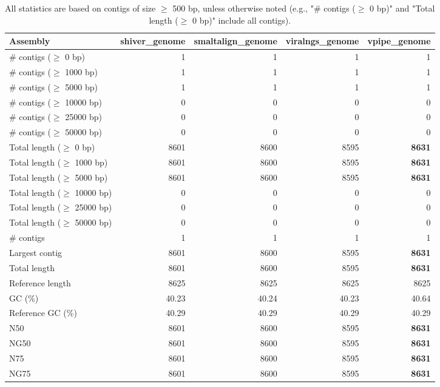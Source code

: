 \documentclass[12pt,a4paper]{article}
\begin{document}
\begin{table}[ht]
\begin{center}
\caption{All statistics are based on contigs of size $\geq$ 500 bp, unless otherwise noted (e.g., "\# contigs ($\geq$ 0 bp)" and "Total length ($\geq$ 0 bp)" include all contigs).}
\begin{tabular}{|l*{4}{|r}|}
\hline
Assembly & shiver\_genome & smaltalign\_genome & viralngs\_genome & vpipe\_genome \\ \hline
\# contigs ($\geq$ 0 bp) & 1 & 1 & 1 & 1 \\ \hline
\# contigs ($\geq$ 1000 bp) & 1 & 1 & 1 & 1 \\ \hline
\# contigs ($\geq$ 5000 bp) & 1 & 1 & 1 & 1 \\ \hline
\# contigs ($\geq$ 10000 bp) & 0 & 0 & 0 & 0 \\ \hline
\# contigs ($\geq$ 25000 bp) & 0 & 0 & 0 & 0 \\ \hline
\# contigs ($\geq$ 50000 bp) & 0 & 0 & 0 & 0 \\ \hline
Total length ($\geq$ 0 bp) & 8601 & 8600 & 8595 & {\bf 8631} \\ \hline
Total length ($\geq$ 1000 bp) & 8601 & 8600 & 8595 & {\bf 8631} \\ \hline
Total length ($\geq$ 5000 bp) & 8601 & 8600 & 8595 & {\bf 8631} \\ \hline
Total length ($\geq$ 10000 bp) & 0 & 0 & 0 & 0 \\ \hline
Total length ($\geq$ 25000 bp) & 0 & 0 & 0 & 0 \\ \hline
Total length ($\geq$ 50000 bp) & 0 & 0 & 0 & 0 \\ \hline
\# contigs & 1 & 1 & 1 & 1 \\ \hline
Largest contig & 8601 & 8600 & 8595 & {\bf 8631} \\ \hline
Total length & 8601 & 8600 & 8595 & {\bf 8631} \\ \hline
Reference length & 8625 & 8625 & 8625 & 8625 \\ \hline
GC (\%) & 40.23 & 40.24 & 40.23 & 40.64 \\ \hline
Reference GC (\%) & 40.29 & 40.29 & 40.29 & 40.29 \\ \hline
N50 & 8601 & 8600 & 8595 & {\bf 8631} \\ \hline
NG50 & 8601 & 8600 & 8595 & {\bf 8631} \\ \hline
N75 & 8601 & 8600 & 8595 & {\bf 8631} \\ \hline
NG75 & 8601 & 8600 & 8595 & {\bf 8631} \\ \hline

\end{tabular}
\end{center}
\end{table}
\end{document}
